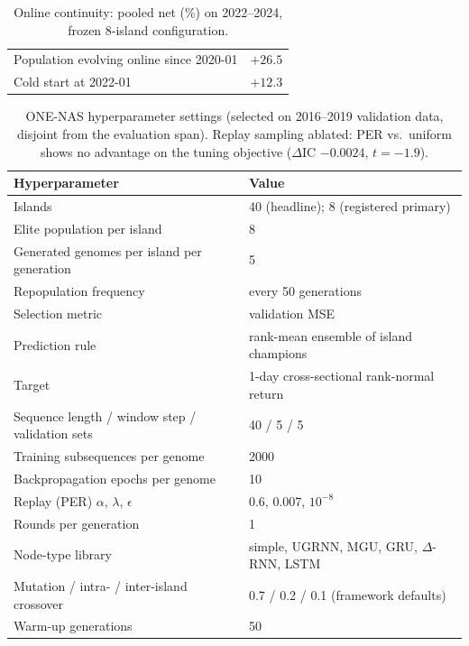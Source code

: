 \begin{table}[h]
\centering
\caption{Online continuity: pooled net (\%) on 2022--2024, frozen 8-island
configuration.}
\label{tab:continuity}
\begin{tabular}{lr}
\toprule
Population evolving online since 2020-01 & $+26.5$ \\
Cold start at 2022-01                     & $+12.3$ \\
\bottomrule
\end{tabular}
\end{table}

\begin{table}[h]
\centering
\caption{ONE-NAS hyperparameter settings (selected on 2016--2019
validation data, disjoint from the evaluation span). Replay sampling
ablated: PER vs.\ uniform shows no advantage on the tuning objective
($\Delta$IC $-0.0024$, $t{=}-1.9$).}
\label{tab:hps}
\begin{tabular}{ll}
\toprule
Hyperparameter & Value \\
\midrule
Islands & 40 (headline); 8 (registered primary) \\
Elite population per island & 8 \\
Generated genomes per island per generation & 5 \\
Repopulation frequency & every 50 generations \\
Selection metric & validation MSE \\
Prediction rule & rank-mean ensemble of island champions \\
Target & 1-day cross-sectional rank-normal return \\
Sequence length / window step / validation sets & 40 / 5 / 5 \\
Training subsequences per genome & 2000 \\
Backpropagation epochs per genome & 10 \\
Replay (PER) $\alpha$, $\lambda$, $\epsilon$ & 0.6, 0.007, $10^{-8}$ \\
Rounds per generation & 1 \\
Node-type library & simple, UGRNN, MGU, GRU, $\Delta$-RNN, LSTM \\
Mutation / intra- / inter-island crossover & 0.7 / 0.2 / 0.1 (framework defaults) \\
Warm-up generations & 50 \\
\bottomrule
\end{tabular}
\end{table}
